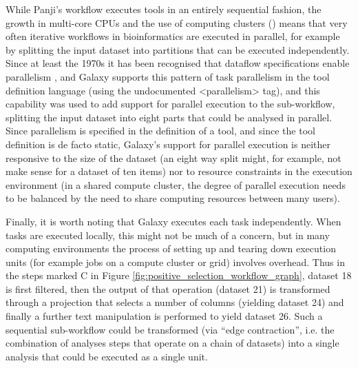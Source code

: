 \documentclass[a4paper,10pt]{scrreprt}
\begin{document}
While Panji's workflow executes tools in an entirely sequential fashion, the growth in multi-core CPUs and the use of computing clusters (\cite{stein_towards_2008}) means that very often iterative workflows in bioinformatics are executed in parallel, for example by splitting the input dataset into partitions that can be executed independently. Since at least the 1970s it has been recognised that dataflow specifications enable parallelism \cite{gostelow_view_1979}, and Galaxy supports this pattern of task parallelism in the tool definition language (using the undocumented <parallelism> tag), and this capability was used to add support for parallel execution to the sub-workflow, splitting the input dataset into eight parts that could be analysed in parallel. Since parallelism is specified in the definition of a tool, and since the tool definition is de facto static, Galaxy's support for parallel execution is neither responsive to the size of the dataset (an eight way split might, for example, not make sense 
for a dataset of ten items) nor to resource constraints in the execution environment (in a shared compute cluster, the degree of parallel execution needs to be balanced by the need to share computing resources between many users).

Finally, it is worth noting that Galaxy executes each task independently. When tasks are executed locally, this might not be much of a concern, but in many computing environments the process of setting up and tearing down execution units (for example jobs on a compute cluster or grid) involves overhead. Thus in the steps marked C in Figure \ref{fig:positive_selection_workflow_graph}, dataset 18 is first filtered, then the output of that operation (dataset 21) is transformed through a projection that selects a number of columns (yielding dataset 24) and finally a further text manipulation is performed to yield dataset 26. Such a sequential sub-workflow could be transformed (via ``edge contraction'', i.e. the combination of analyses steps that operate on a chain of datasets) into a single analysis that could be executed as a single unit.
\end{document}
